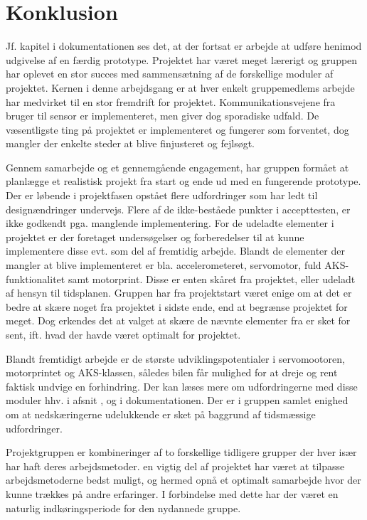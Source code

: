 \chapter{Konklusion}
\label{ch:Konklusion}

Jf. kapitel  i dokumentationen ses det, at der fortsat er arbejde at udføre henimod udgivelse af en færdig prototype.
Projektet har været meget lærerigt og gruppen har oplevet en stor succes med sammensætning af de forskellige moduler af projektet. 
Kernen i denne arbejdsgang er at hver enkelt gruppemedlems arbejde har medvirket til en stor fremdrift for projektet. 
Kommunikationsvejene fra bruger til sensor er implementeret, men giver dog sporadiske udfald. 
De væsentligste ting på projektet er implementeret og fungerer som forventet, dog mangler der enkelte steder at blive finjusteret og fejlsøgt. 

Gennem samarbejde og et gennemgående engagement, har gruppen formået at planlægge et realistisk projekt fra start og ende ud med en fungerende prototype. 
Der er løbende i projektfasen opstået flere udfordringer som har ledt til  designændringer undervejs. 
Flere af de ikke-beståede punkter i accepttesten, er ikke godkendt pga. manglende implementering. 
For de udeladte elementer i projektet er der foretaget undersøgelser og forberedelser til at kunne implementere disse evt. som del af fremtidig arbejde. 
Blandt de elementer der mangler at blive implementeret er bla. accelerometeret, servomotor, fuld AKS-funktionalitet samt motorprint. 
Disse er enten skåret fra projektet, eller udeladt af hensyn til tidsplanen. 
Gruppen har fra projektstart været enige om at det er bedre at skære noget fra projektet i sidste ende, end at begrænse projektet for meget. 
Dog erkendes det at valget at skære de nævnte elementer fra er sket for sent, ift. hvad der havde været optimalt for projektet.

Blandt fremtidigt arbejde er de største udviklingspotentialer i servomootoren, motorprintet og AKS-klassen, således bilen får mulighed for at dreje og rent faktisk undvige en forhindring. 
Der kan læses mere om udfordringerne med disse moduler hhv. i afsnit ,  og  i dokumentationen. 
Der er i gruppen samlet enighed om at nedskæringerne udelukkende er sket på baggrund af tidsmæssige udfordringer.

Projektgruppen er kombineringer af to forskellige tidligere grupper der hver især har haft deres arbejdsmetoder.
en vigtig del af projektet har været at  tilpasse arbejdsmetoderne bedst muligt, og hermed opnå et optimalt samarbejde hvor der kunne trækkes på andre erfaringer. 
I forbindelse med dette har der været en naturlig indkøringsperiode for den nydannede gruppe.


